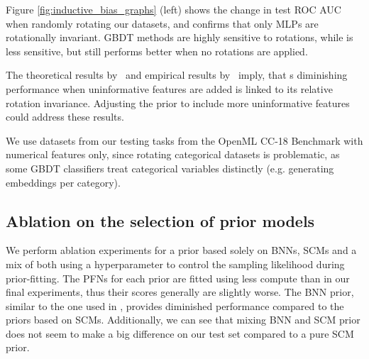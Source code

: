 \documentclass{article}
\begin{document}
Figure \ref{fig:inductive_bias_graphs} (left) shows the change in test ROC AUC when randomly rotating our datasets, and confirms that only MLPs are rotationally invariant. GBDT methods are highly sensitive to rotations, while \methodname{} is less sensitive, but still performs better when no rotations are applied.%

The theoretical results by~\cite{ng2004feature} and empirical results by~\cite{grinsztajn2022why} imply, that \methodname{}\textquotesingle{}s diminishing performance when uninformative features are added is linked to it\textquotesingle{}s relative rotation invariance. Adjusting the prior to include more uninformative features could address these results.

We use datasets from our testing tasks from the OpenML CC-18 Benchmark with numerical features only, since rotating categorical datasets is problematic, as some GBDT classifiers treat categorical variables distinctly (e.g. generating embeddings per category).

\subsection{Ablation on the selection of prior models}
\label{app: prior_ablation}
We perform ablation experiments for a prior based solely on BNNs, SCMs and a mix of both using a hyperparameter to control the sampling likelihood during prior-fitting.
The PFNs for each prior are fitted using less compute than in our final experiments, thus their scores generally are slightly worse.
The BNN prior, similar to the one used in \citet{muller-iclr22a}, provides diminished performance compared to the priors based on SCMs.
Additionally, we can see that mixing BNN and SCM prior does not seem to make a big difference on our test set compared to a pure SCM prior.

\begin{table}[htbp]
    \centering
    
    \vspace{.3cm}
    \caption{An evaluation of the impact of the prior mixing on the final performance. Our final model was trained in the \textit{SCM + BNN} setting (see Section \ref{sec:tabprior} for details on the priors).}
    \label{tab:scm bnn ablation}
\end{table}

\end{document}
